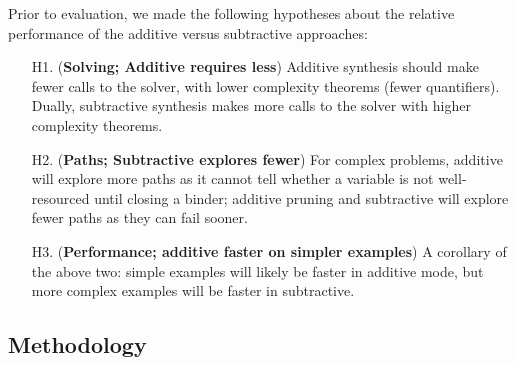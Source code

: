 \newcommand{\stderr}[1]{\textcolor{gray}{${#1}$}} %
\newcommand{\fail}{\textcolor{mypink3}{$\times$}}
\newcommand{\success}{\checkmark}
\newcommand{\highlight}[1]{%
{\setlength{\fboxsep}{0pt}\colorbox{yellow!50}{$\displaystyle#1$}}}

Prior to evaluation, we made the following hypotheses about the
relative performance of the additive versus subtractive approaches:
%
\begin{enumerate}
\item[H1.] (\textbf{Solving; Additive requires less}) Additive synthesis should make fewer calls to the solver, with lower
complexity theorems (fewer quantifiers). Dually,
subtractive synthesis makes more calls to the solver with
higher complexity theorems.

\item[H2.] (\textbf{Paths; Subtractive explores fewer}) For complex problems, additive will
explore more paths as it cannot tell whether a variable is not
well-resourced until closing a binder; additive pruning and subtractive will
explore fewer paths as they can fail sooner.

\item[H3.] (\textbf{Performance; additive faster on simpler examples}) A
corollary of the above two: simple examples will likely be faster in additive
mode, but more complex examples will be faster in subtractive.
\end{enumerate}

\subsection{Methodology}

